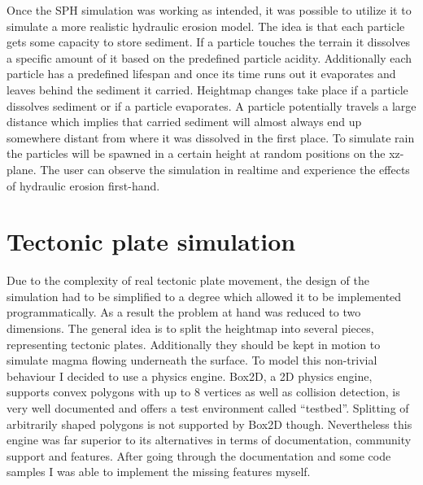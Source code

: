 \documentclass[11pt,a4paper,twoside,openright]{report}
\begin{document}
Once the SPH simulation was working as intended, it was possible to utilize it to simulate a more realistic hydraulic erosion model. The idea is that each particle gets some capacity to store sediment. If a particle touches the terrain it dissolves a specific amount of it based on the predefined particle acidity. Additionally each particle has a predefined lifespan and once its time runs out it evaporates and leaves behind the sediment it carried. Heightmap changes take place if a particle dissolves sediment or if a particle evaporates. A particle potentially travels a large distance which implies that carried sediment will almost always end up somewhere distant from where it was dissolved in the first place. To simulate rain the particles will be spawned in a certain height at random positions on the xz-plane. The user can observe the simulation in realtime and experience the effects of hydraulic erosion first-hand.

\section{Tectonic plate simulation}
Due to the complexity of real tectonic plate movement, the design of the simulation had to be simplified to a degree which allowed it to be implemented programmatically. As a result the problem at hand was reduced to two dimensions. The general idea is to split the heightmap into several pieces, representing tectonic plates. Additionally they should be kept in motion to simulate magma flowing underneath the surface. To model this non-trivial behaviour I decided to use a physics engine. Box2D, a 2D physics engine, supports convex polygons with up to 8 vertices as well as collision detection, is very well documented and offers a test environment called ``testbed''. Splitting of arbitrarily shaped polygons is not supported by Box2D though. Nevertheless this engine was far superior to its alternatives in terms of documentation, community support and features. After going through the documentation and some code samples I was able to implement the missing features myself.
\end{document}
